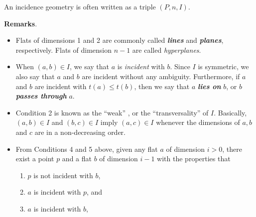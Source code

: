 \documentclass[12pt]{article}
\begin{document}
An incidence geometry is often written as a triple $(P,n,I)$.

\textbf{Remarks}.
\begin{itemize}
\item Flats of dimensions 1 and 2 are commonly called \textbf{\emph{lines}} and \textbf{\emph{planes}}, respectively.  Flats of dimension $n-1$ are called \emph{hyperplanes}.
\item When $(a,b)\in I$, we say that $a$ is \emph{incident} with $b$. Since $I$ is symmetric, we also say that $a$ and
$b$ are incident without any ambiguity.  Furthermore, if $a$ and $b$ are incident with $t(a)\leq t(b)$, then we say that $a$ \textbf{\emph{lies on}} $b$, or $b$ \textbf{\emph{passes through}} $a$.
\item Condition 2 is known as the ``weak'' , or the ``transversality'' of $I$.  Basically, $(a,b)\in I$ and $(b,c)\in I$ imply $(a,c)\in I$ whenever the dimensions of $a,b$ and
$c$ are in a non-decreasing order.
\item From Conditions 4 and 5 above, given any flat $a$ of dimension $i>0$, there exist a point $p$ and a flat $b$ of dimension $i-1$ with the properties that

\begin{enumerate}
\item $p$ is not incident with $b$,
\item $a$ is incident with $p$, and
\item $a$ is incident with $b$,
\end{enumerate}


\end{itemize}
\end{document}
